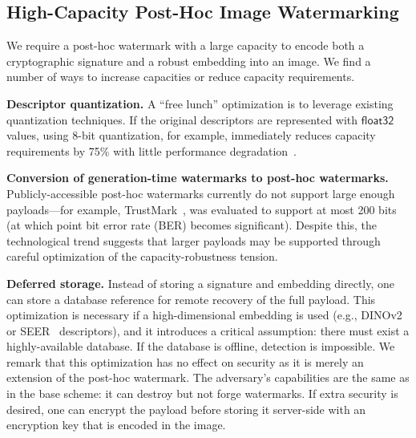 \documentclass[12pt]{article}
\begin{document}
\subsection{High-Capacity Post-Hoc Image Watermarking}
We require a post-hoc watermark with a large capacity to encode both a cryptographic signature and a robust embedding into an image.
We find a number of ways to increase capacities or reduce capacity requirements.

\textbf{Descriptor quantization.} A ``free lunch'' optimization is to leverage existing quantization techniques. 
If the original descriptors are represented with $\mathsf{float32}$ values, using $8$-bit quantization, for example, immediately reduces capacity requirements by 75\% with little performance degradation~\citep{jacob2018quantization}.

\textbf{Conversion of generation-time watermarks to post-hoc watermarks.}
Publicly-accessible post-hoc watermarks currently do not support large enough payloads---for example, TrustMark~\citep{bui2023trustmark}, was evaluated to support at most 200 bits (at which point bit error rate (BER) becomes significant).
Despite this, the technological trend suggests that larger payloads may be supported through careful optimization of the capacity-robustness tension.


\textbf{Deferred storage.}
Instead of storing a signature and embedding directly, one can store a database reference for remote recovery of the full payload.
This optimization is necessary if a high-dimensional embedding is used (e.g., DINOv2~\citep{oquab2023dinov2} or SEER~\citep{goyal2021self} descriptors), and it introduces a critical assumption: there must exist a highly-available database.
If the database is offline, detection is impossible.
We remark that this optimization has no effect on security as it is merely an extension of the post-hoc watermark.
The adversary's capabilities are the same as in the base scheme: it can destroy but not forge watermarks.
If extra security is desired, one can encrypt the payload before storing it server-side with an encryption key that is encoded in the image.
\end{document}
